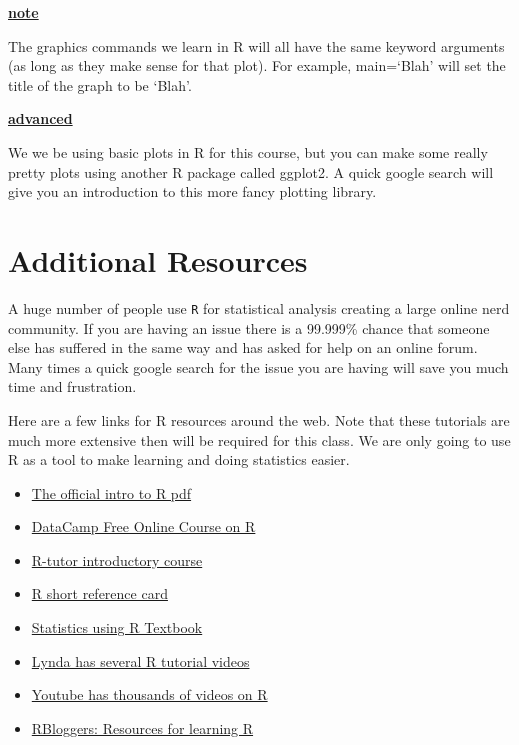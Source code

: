\documentclass[
]{book}
\providecommand{\tightlist}{%
  \setlength{\itemsep}{0pt}\setlength{\parskip}{0pt}}
\newenvironment{rmdblock}[1]
  {\begin{shaded*}
  \centerline{\underline{\textbf{#1}}}

  }
  {
  \end{shaded*}
  }
\newenvironment{note}
  {\begin{rmdblock}{note}}
  {\end{rmdblock}}
\newenvironment{advanced}
  {\begin{rmdblock}{advanced}}
  {\end{rmdblock}}
\theoremstyle{definition}
\theoremstyle{definition}
\theoremstyle{definition}
\theoremstyle{definition}
\theoremstyle{remark}
\begin{document}
\begin{note}
The graphics commands we learn in R will all have the same keyword arguments (as long as they make sense for that plot). For example, main=`Blah' will set the title of the graph to be `Blah'.
\end{note}

\begin{advanced}
We we be using basic plots in R for this course, but you can make some really pretty plots using another R package called ggplot2. A quick google search will give you an introduction to this more fancy plotting library.
\end{advanced}

\hypertarget{additional-resources}{%
\section{Additional Resources}\label{additional-resources}}

A huge number of people use \texttt{R} for statistical analysis creating a large online nerd community. If you are having an issue there is a 99.999\% chance that someone else has suffered in the same way and has asked for help on an online forum. Many times a quick google search for the issue you are having will save you much time and frustration.

Here are a few links for R resources around the web. Note that these tutorials are much more extensive then will be required for this class. We are only going to use R as a tool to make learning and doing statistics easier.

\begin{itemize}
\tightlist
\item
  \href{https://cran.r-project.org/doc/manuals/R-intro.pdf}{The official intro to R pdf}
\item
  \href{https://www.datacamp.com/courses/free-introduction-to-r}{DataCamp Free Online Course on R}
\item
  \href{http://www.r-tutor.com/r-introduction}{R-tutor introductory course}
\item
  \href{https://onlinecourses.science.psu.edu/statprogram/sites/onlinecourses.science.psu.edu.statprogram/files/lesson00/Short-refcard.pdf}{R short reference card}
\item
  \href{https://cran.r-project.org/web/packages/IPSUR/vignettes/IPSUR.pdf}{Statistics using R Textbook}
\item
  \href{https://www.lynda.com/}{Lynda has several R tutorial videos}
\item
  \href{www.youtube.com}{Youtube has thousands of videos on R}
\item
  \href{https://www.r-bloggers.com/how-to-learn-r-2/}{RBloggers: Resources for learning R}
\end{itemize}
\end{document}
